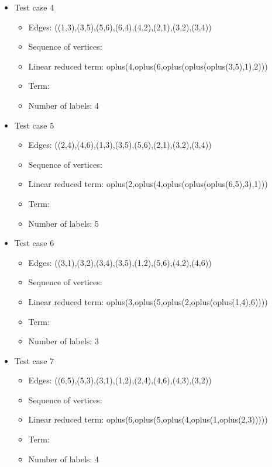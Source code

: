 \documentclass[a4paper, 12pt]{article}
\begin{document}
\begin{itemize}
\item Test case 4
	\begin{itemize}
		\item Edges: ((1,3),(3,5),(5,6),(6,4),(4,2),(2,1),(3,2),(3,4))
		\item Sequence of vertices: 
		\item Linear reduced term: oplus(4,oplus(6,oplus(oplus(oplus(3,5),1),2)))
		\item Term: 
		\item Number of labels: 4
	\end{itemize}

\item Test case 5
	\begin{itemize}
		\item Edges: ((2,4),(4,6),(1,3),(3,5),(5,6),(2,1),(3,2),(3,4))
		\item Sequence of vertices: 
		\item Linear reduced term: oplus(2,oplus(4,oplus(oplus(oplus(6,5),3),1)))
		\item Term: 
		\item Number of labels: 5
	\end{itemize}

\item Test case 6
	\begin{itemize}
		\item Edges: ((3,1),(3,2),(3,4),(3,5),(1,2),(5,6),(4,2),(4,6))
		\item Sequence of vertices: 
		\item Linear reduced term: oplus(3,oplus(5,oplus(2,oplus(oplus(1,4),6))))
		\item Term: 
		\item Number of labels: 3
	\end{itemize}

\item Test case 7
	\begin{itemize}
		\item Edges: ((6,5),(5,3),(3,1),(1,2),(2,4),(4,6),(4,3),(3,2))
		\item Sequence of vertices: 
		\item Linear reduced term: oplus(6,oplus(5,oplus(4,oplus(1,oplus(2,3)))))
		\item Term: 
		\item Number of labels: 4
	\end{itemize}
\end{itemize}
\end{document}
